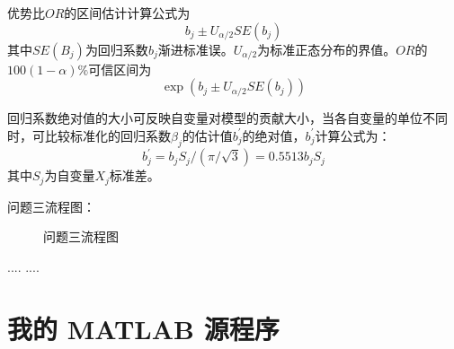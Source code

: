 \documentclass[bwprint]{cumcmthesis}
\begin{document}
优势比$ OR $的区间估计计算公式为
\begin{equation}
b_{j}\pm U_{\alpha /2}SE(b_{j}) 
\end{equation}
其中$ SE(B_{j}) $为回归系数$ b_{j} $渐进标准误。$ U_{\alpha /2} $为标准正态分布的界值。$ OR $的$ 100(1-\alpha)\% $可信区间为
\begin{equation}
\exp(b_{j}\pm U_{\alpha /2}SE(b_{j})) 
\end{equation}

回归系数绝对值的大小可反映自变量对模型的贡献大小，当各自变量的单位不同时，可比较标准化的回归系数$ \beta_{j} $的估计值$ b_{j}^{'} $的绝对值，$ b_{j}^{'} $计算公式为：
\begin{equation}
b_{j}^{'}=b_{j}S_{j}/(\pi/\sqrt{3})=0.5513b_{j}S_{j}
\end{equation}
其中$ S_{j} $为自变量$ X_{j} $标准差。


问题三流程图：
\begin{figure}[!h]
\centering
\caption{问题三流程图}
\end{figure}
\begin{thebibliography}{9}
  ....
  ....
\end{thebibliography}
\appendix
\section{我的 MATLAB 源程序}
\end{document}

